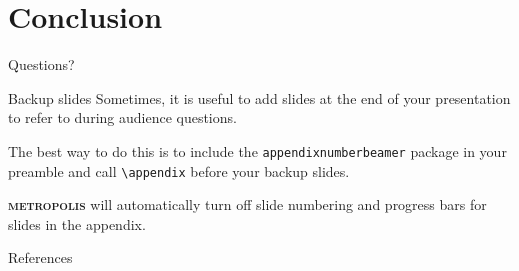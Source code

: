 \documentclass[aspectratio=169,10pt]{beamer}
\newcommand{\themename}{\textbf{\textsc{metropolis}}\xspace}
\begin{document}
\section{Conclusion}

\begin{frame}[standout]
\centering
  Questions?
\end{frame}

\appendix

\begin{frame}[fragile]{Backup slides}
  Sometimes, it is useful to add slides at the end of your presentation to
  refer to during audience questions.

  The best way to do this is to include the \verb|appendixnumberbeamer|
  package in your preamble and call \verb|\appendix| before your backup slides.

  \themename will automatically turn off slide numbering and progress bars for
  slides in the appendix.
\end{frame}

\begin{frame}[allowframebreaks]{References}

  
  

\end{frame}
\end{document}
